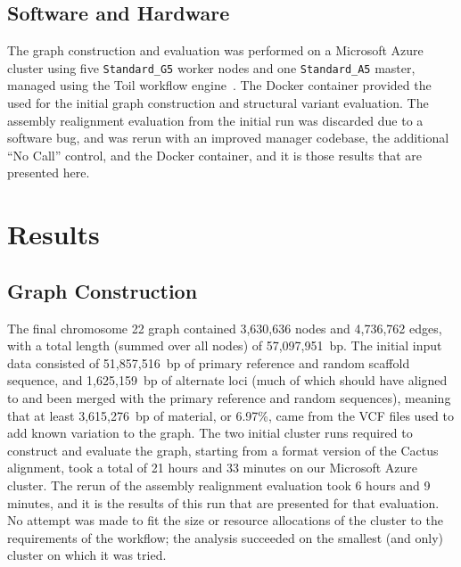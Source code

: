 \subsection{Software and Hardware}

\begin{sloppypar}
The graph construction and evaluation was performed on a Microsoft Azure cluster using five \texttt{Standard\_G5} worker nodes and one \texttt{Standard\_A5} master, managed using the Toil workflow engine~\cite{vivian2017toil}. The  Docker container provided the \vg used for the initial graph construction and structural variant evaluation. The assembly realignment evaluation from the initial run was discarded due to a software bug, and was rerun with an improved manager codebase, the additional ``No Call'' control, and the  Docker container, and it is those results that are presented here.
\end{sloppypar}


\section{Results}

\subsection{Graph Construction}

The final chromosome 22 graph contained 3,630,636 nodes and 4,736,762 edges, with a total length (summed over all nodes) of 57,097,951~bp. The initial input data consisted of 51,857,516~bp of primary reference and random scaffold sequence, and 1,625,159~bp of alternate loci (much of which should have aligned to and been merged with the primary reference and random sequences), meaning that at least 3,615,276~bp of material, or 6.97\%, came from the VCF files used to add known variation to the graph. %
The two initial cluster runs required to construct and evaluate the graph, starting from a \vg format version of the Cactus alignment, took a total of 21 hours and 33 minutes on our Microsoft Azure cluster. The rerun of the assembly realignment evaluation took 6 hours and 9 minutes, and it is the results of this run that are presented for that evaluation. No attempt was made to fit the size or resource allocations of the cluster to the requirements of the workflow; the analysis succeeded on the smallest (and only) cluster on which it was tried.

